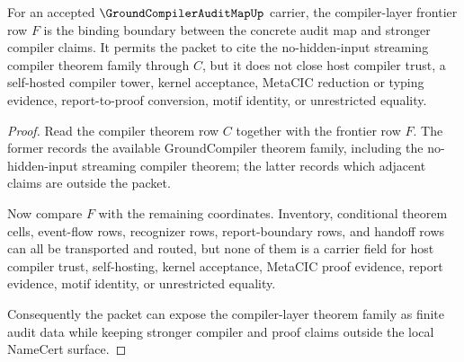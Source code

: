 \begin{theorem}
\label{thm:ground-compiler-audit-map-compiler-layer-frontier}
For an accepted $\GroundCompilerAuditMapUp$ carrier, the compiler-layer frontier row $F$ is the binding boundary between the concrete audit map and stronger compiler claims. It permits the packet to cite the no-hidden-input streaming compiler theorem family through $C$, but it does not close host compiler trust, a self-hosted compiler tower, kernel acceptance, MetaCIC reduction or typing evidence, report-to-proof conversion, motif identity, or unrestricted equality.
\end{theorem}
\begin{proof}
Read the compiler theorem row $C$ together with the frontier row $F$. The former records the available GroundCompiler theorem family, including the no-hidden-input streaming compiler theorem; the latter records which adjacent claims are outside the packet.

Now compare $F$ with the remaining coordinates. Inventory, conditional theorem cells, event-flow rows, recognizer rows, report-boundary rows, and handoff rows can all be transported and routed, but none of them is a carrier field for host compiler trust, self-hosting, kernel acceptance, MetaCIC proof evidence, report evidence, motif identity, or unrestricted equality.

Consequently the packet can expose the compiler-layer theorem family as finite audit data while keeping stronger compiler and proof claims outside the local NameCert surface.
\end{proof}

